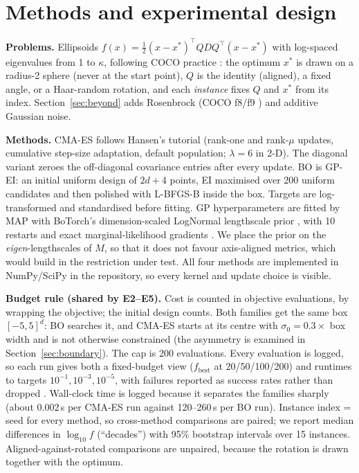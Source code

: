 \documentclass[10pt,a4paper]{article}
\begin{document}
\section{Methods and experimental design}
\textbf{Problems.} Ellipsoids $f(x)=\tfrac12(x-x^*)^\top QDQ^\top(x-x^*)$ with log-spaced eigenvalues
from 1 to $\kappa$, following COCO practice \citep{hansen2021coco}: the optimum $x^*$ is drawn on a
radius-2 sphere (never at the start point), $Q$ is the identity (aligned), a fixed angle, or a Haar-random
rotation, and each \emph{instance} fixes $Q$ and $x^*$ from its index. Section~\ref{sec:beyond} adds
Rosenbrock (COCO f8/f9 \citep{hansen2009bbobfunctions}) and additive Gaussian noise.

\textbf{Methods.} CMA-ES follows Hansen's tutorial (rank-one and rank-$\mu$ updates, cumulative step-size
adaptation, default population; $\lambda=6$ in 2-D). The diagonal variant zeroes the off-diagonal
covariance entries after every update. BO is GP-EI: an initial uniform design of $2d+4$ points, EI
maximised over 200 uniform candidates and then polished with L-BFGS-B inside the box. Targets are
log-transformed and standardised before fitting. GP hyperparameters are fitted by MAP with BoTorch's
dimension-scaled LogNormal lengthscale prior \citep{hvarfner2024vanilla}, with 10 restarts and exact
marginal-likelihood gradients \citep[eq.~5.9]{rasmussen2006gpml}. We place the prior on the
\emph{eigen}-lengthscales of $M$, so that it does not favour axis-aligned metrics, which would build in
the restriction under test. All four methods are implemented in NumPy/SciPy in the repository, so every
kernel and update choice is visible.

\textbf{Budget rule (shared by E2--E5).} Cost is counted in objective evaluations, by wrapping the
objective; the initial design counts. Both families get the same box $[-5,5]^d$: BO searches it, and
CMA-ES starts at its centre with $\sigma_0=0.3\times$ box width and is not otherwise constrained (the
asymmetry is examined in Section~\ref{sec:boundary}). The cap is 200 evaluations. Every evaluation is
logged, so each run gives both a fixed-budget view ($f_{\text{best}}$ at 20/50/100/200) and runtimes to
targets $10^{-1},10^{-3},10^{-5}$, with failures reported as success rates rather than dropped
\citep{hansen2021coco}. Wall-clock time is logged because it separates the families sharply (about
0.002\,s per CMA-ES run against 120--260\,s per BO run). Instance index = seed for every method, so
cross-method comparisons are paired; we report median differences in $\log_{10} f$ (``decades'') with 95\%
bootstrap intervals over 15 instances. Aligned-against-rotated comparisons are unpaired, because the
rotation is drawn together with the optimum.
\end{document}
